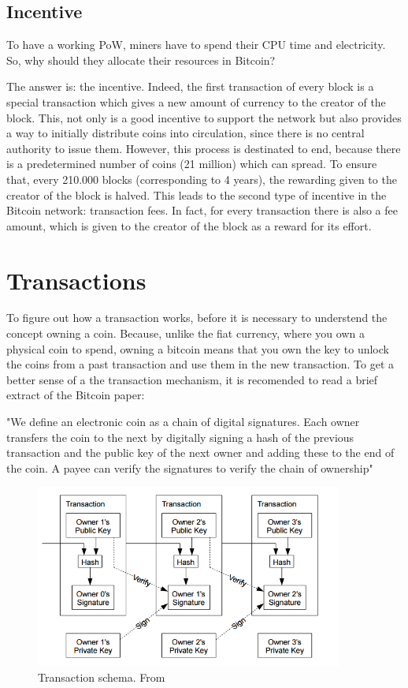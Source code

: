 \subsection{Incentive}
\label{sec:incentive}

To have a working PoW, miners have to spend their CPU time and electricity. So, why 
should they allocate their resources in Bitcoin?

The answer is: the incentive. Indeed, the first transaction of every block is a special
transaction which gives a new amount of currency to the creator of the block. This, 
not only is a good incentive to support the network but also provides a way to initially 
distribute coins into circulation, since there is no central authority to issue them.
However, this process is destinated to end, because there is a predetermined number
of coins (21 million) which can spread. To ensure that, every 210.000 blocks 
(corresponding to 4 years), the rewarding given to the creator of the block is halved.
This leads to the second type of incentive in the Bitcoin network: transaction fees.
In fact, for every transaction there is also a fee amount, which is given to the 
creator of the block as a reward for its effort.


\section{Transactions}
\label{sec:transactions}

To figure out how a transaction works, before it is necessary to understend the concept
owning a coin. Because, unlike the fiat currency, where you own a physical coin
to spend, owning a bitcoin means that you own the key to unlock the coins from a past
transaction and use them in the new transaction. To get a better sense of a the 
transaction mechanism, it is recomended to read a brief extract of the Bitcoin paper: 

"We define an electronic coin as a chain of digital signatures.  Each owner transfers 
the coin to the next by digitally signing a hash of the previous transaction and the 
public key of the next owner and adding these to the end of the coin.  A payee can 
verify the signatures to verify the chain of ownership"\cite{bitcoin}
\begin{figure}
    \centering
    \includegraphics[height=6cm]{bitcoin-transaction.png}
    \caption{Transaction schema. From \cite{bitcoin}}
    \label{fig:trx}
\end{figure}

